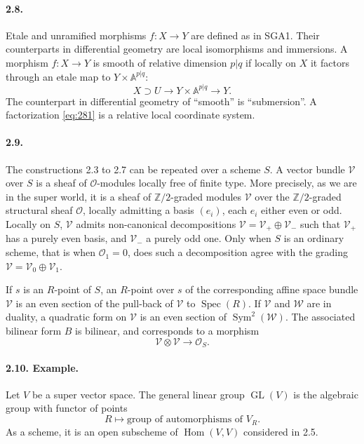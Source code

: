 \documentclass[11pt]{article}
\newcommand{\Z}{\mathbb Z}
\newcommand{\Spec}{\operatorname{Spec}}
\newcommand{\Hom}{\operatorname{Hom}}
\newcommand{\GL}{\operatorname{GL}}
\newcommand{\Sym}{\operatorname{Sym}}
\newcommand{\calO}{\mathcal O}
\begin{document}
\paragraph{2.8.}
Etale and unramified morphisms $f:X\to Y$ are defined as in SGA1. Their counterparts in differential geometry are local isomorphisms and immersions. A morphism $f:X\to Y$ is smooth of relative dimension $p|q$ if locally on $X$ it factors through an etale map to $Y\times \mathbb A^{p|q}$:
\begin{equation}
\label{eq:281}
X\supset U\longrightarrow Y\times\mathbb A^{p|q}\longrightarrow Y.
\end{equation}
The counterpart in differential geometry of ``smooth'' is ``submersion''. A factorization \eqref{eq:281} is a relative local coordinate system.

\paragraph{2.9.}
The constructions 2.3 to 2.7 can be repeated over a scheme $S$. A vector bundle $\mathcal V$ over $S$ is a sheaf of $\calO$-modules locally free of finite type. More precisely, as we are in the super world, it is a sheaf of $\Z/2$-graded modules $\mathcal V$ over the $\Z/2$-graded structural sheaf $\calO$, locally admitting a basis $(e_i)$, each $e_i$ either even or odd. Locally on $S$, $\mathcal V$ admits non-canonical decompositions $\mathcal V=\mathcal V_+\oplus\mathcal V_-$ such that $\mathcal V_+$ has a purely even basis, and $\mathcal V_-$ a purely odd one. Only when $S$ is an ordinary scheme, that is when $\calO_1=0$, does such a decomposition agree with the grading $\mathcal V=\mathcal V_0\oplus\mathcal V_1$.

If $s$ is an $R$-point of $S$, an $R$-point over $s$ of the corresponding affine space bundle $\mathcal V$ is an even section of the pull-back of $\mathcal V$ to $\Spec(R)$. If $\mathcal V$ and $\mathcal W$ are in duality, a quadratic form on $\mathcal V$ is an even section of $\Sym^2(\mathcal W)$. The associated bilinear form $B$ is bilinear, and corresponds to a morphism
\[
\mathcal V\otimes\mathcal V\longrightarrow \calO_S.
\]

\paragraph{2.10. Example.}
Let $V$ be a super vector space. The general linear group $\GL(V)$ is the algebraic group with functor of points
\[
R\longmapsto \text{group of automorphisms of }V_R.
\]
As a scheme, it is an open subscheme of $\Hom(V,V)$ considered in 2.5.
\end{document}
